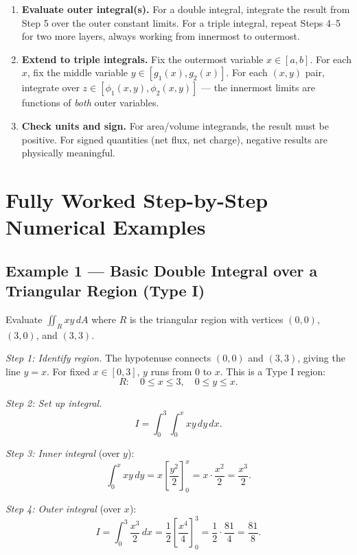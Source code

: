 \documentclass[12pt,a4paper]{article}
\begin{document}
\begin{center}
{\begin{minipage}{0.88\linewidth}
\begin{enumerate}
  \item \textbf{Evaluate outer integral(s).} For a double integral, integrate the result from Step 5 over the outer constant limits. For a triple integral, repeat Steps 4--5 for two more layers, always working from innermost to outermost.

  \item \textbf{Extend to triple integrals.} Fix the outermost variable \(x \in [a,b]\). For each \(x\), fix the middle variable \(y \in [g_1(x), g_2(x)]\). For each \((x,y)\) pair, integrate over \(z \in [\phi_1(x,y), \phi_2(x,y)]\) --- the innermost limits are functions of \emph{both} outer variables.

  \item \textbf{Check units and sign.} For area/volume integrands, the result must be positive. For signed quantities (net flux, net charge), negative results are physically meaningful.
\end{enumerate}
\end{minipage}
}
\end{center}

\section{Fully Worked Step-by-Step Numerical Examples}

\subsection*{Example 1 --- Basic Double Integral over a Triangular Region (Type I)}

Evaluate \(\displaystyle\iint_R xy\,dA\) where \(R\) is the triangular region with vertices \((0,0)\), \((3,0)\), and \((3,3)\).

\textit{Step 1: Identify region.} The hypotenuse connects \((0,0)\) and \((3,3)\), giving the line \(y=x\). For fixed \(x \in [0,3]\), \(y\) runs from \(0\) to \(x\). This is a Type I region:
\[
  R:\quad 0 \le x \le 3,\quad 0 \le y \le x.
\]

\textit{Step 2: Set up integral.}
\[
  I = \int_0^3 \int_0^x xy\,dy\,dx.
\]

\textit{Step 3: Inner integral} (over \(y\)):
\[
  \int_0^x xy\,dy = x\left[\frac{y^2}{2}\right]_0^x = x \cdot \frac{x^2}{2} = \frac{x^3}{2}.
\]

\textit{Step 4: Outer integral} (over \(x\)):
\[
  I = \int_0^3 \frac{x^3}{2}\,dx = \frac{1}{2}\left[\frac{x^4}{4}\right]_0^3 = \frac{1}{2}\cdot\frac{81}{4} = \frac{81}{8}.
\]
\end{document}
